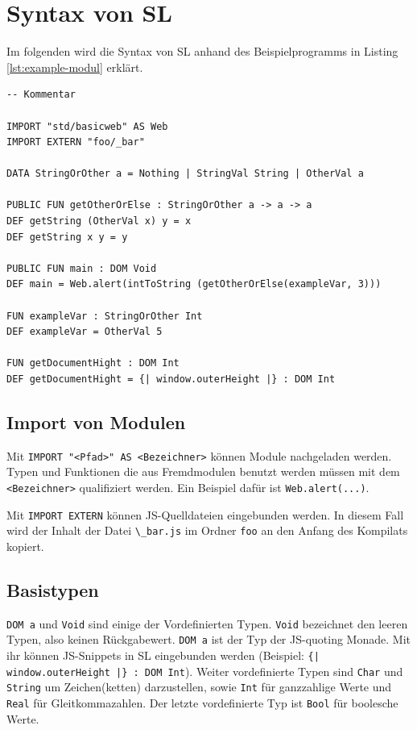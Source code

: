 \documentclass[12pt,bibtotoc]{scrreprt}
\begin{document}
\section{Syntax von SL}

Im folgenden wird die Syntax von SL anhand des Beispielprogramms in Listing \ref{lst:example-modul} erklärt.

\begin{lstlisting}[caption=Beispielmodul, label=lst:example-modul, float=h]
-- Kommentar

IMPORT "std/basicweb" AS Web
IMPORT EXTERN "foo/_bar"

DATA StringOrOther a = Nothing | StringVal String | OtherVal a

PUBLIC FUN getOtherOrElse : StringOrOther a -> a -> a
DEF getString (OtherVal x) y = x
DEF getString x y = y

PUBLIC FUN main : DOM Void
DEF main = Web.alert(intToString (getOtherOrElse(exampleVar, 3)))

FUN exampleVar : StringOrOther Int
DEF exampleVar = OtherVal 5

FUN getDocumentHight : DOM Int
DEF getDocumentHight = {| window.outerHeight |} : DOM Int

\end{lstlisting}

\subsection{Import von Modulen}

Mit \lstinline!IMPORT "<Pfad>" AS <Bezeichner>! können Module nachgeladen werden. Typen und Funktionen die aus Fremdmodulen benutzt werden müssen mit dem \lstinline!<Bezeichner>! qualifiziert werden. Ein Beispiel dafür ist \lstinline!Web.alert(...)!. 
  
  Mit \lstinline!IMPORT EXTERN! können \ac{JS}-Quelldateien eingebunden werden. In diesem Fall wird der Inhalt der Datei \lstinline!\_bar.js! im Ordner \lstinline!foo! an den Anfang des Kompilats kopiert.

\subsection{Basistypen}

\lstinline!DOM a! und \lstinline!Void! sind einige der Vordefinierten Typen. \lstinline!Void! bezeichnet den leeren Typen, also keinen Rückgabewert. \lstinline!DOM a! ist der Typ der JS-quoting Monade. Mit ihr können JS-Snippets in SL eingebunden werden (Beispiel: \lstinline!{| window.outerHeight |} : DOM Int!). Weiter vordefinierte Typen sind \lstinline!Char! und \lstinline!String! um Zeichen(ketten) darzustellen, sowie \lstinline!Int! für ganzzahlige Werte und \lstinline!Real! für Gleitkommazahlen. Der letzte vordefinierte Typ ist \lstinline!Bool! für boolesche Werte.
  
\end{document}
